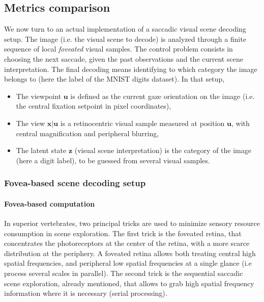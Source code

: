 \documentclass[12pt,twoside,openright]{article}
\begin{document}

% 
%
%
\subsection{Metrics comparison}

{\color{Purple} We now turn to an actual implementation of a saccadic visual scene decoding setup. The   image (i.e. the visual scene to decode) is analyzed through a finite sequence of local \emph{foveated} visual samples.  The control problem consists in choosing the next saccade, given the past observations and the current scene interpretation. The final decoding means identifying to which category the image belongs to (here the label of the MNIST digits dataset). 
	In that setup, 
	\begin{itemize}
		\item The viewpoint $\boldsymbol{u}$ is defined as the current gaze orientation on the image (i.e. the central fixation setpoint in pixel coordinates),
		\item The view $\boldsymbol{x}|\boldsymbol{u}$ is a retinocentric visual sample measured at position $\boldsymbol{u}$, with central magnification and peripheral blurring,
		\item The latent state $\boldsymbol{z}$ (visual scene interpretation) is the category of the image (here a digit label), to be guessed from several visual samples.
	\end{itemize} 
}

\subsubsection{Fovea-based scene decoding setup }

\paragraph{Fovea-based computation} 
In superior vertebrates, two principal tricks are used to minimize sensory resource consumption in scene exploration. The first trick is the foveated retina, that concentrates the photoreceptors at the center of the retina, with a more scarce distribution at the periphery. A foveated retina allows both treating central high spatial frequencies, and peripheral low spatial frequencies at a single glance (i.e process several scales in parallel). The second trick is the sequential saccadic scene exploration, already mentioned, that allows to grab high spatial frequency information where it is necessary (serial processing).
\end{document}
